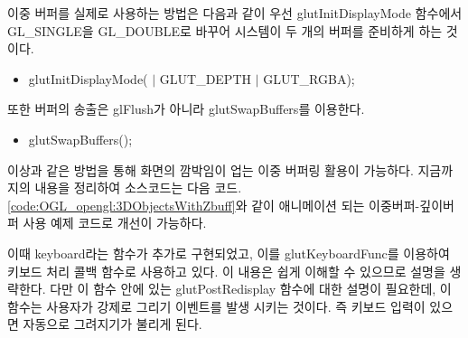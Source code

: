 이중 버퍼를 실제로 사용하는 방법은 다음과 같이 우선 glutInitDisplayMode 함수에서 {\sf GL\_SINGLE}을 {\sf GL\_DOUBLE}로 바꾸어 시스템이 두 개의 버퍼를 준비하게 하는 것이다.

\begin{itemize}
\item {\sf glutInitDisplayMode( \color{red}{GLUT\_DOUBLE} $|$ GLUT\_DEPTH $|$ GLUT\_RGBA);}
\end{itemize}

또한 버퍼의 송출은 {\sf glFlush}가 아니라 {\sf glutSwapBuffers}를 이용한다.

\begin{itemize}
\item {\sf glutSwapBuffers();}
\end{itemize}

이상과 같은 방법을 통해 화면의 깜박임이 업는 이중 버퍼링 활용이 가능하다. 지금까지의 내용을 정리하여 소스코드는 다음 코드. \ref{code:OGL_opengl:3DObjectsWithZbuff}와 같이 애니메이션 되는 이중버퍼-깊이버퍼 사용 예제 코드로 개선이 가능하다.

이때 {\sf keyboard}라는 함수가 추가로 구현되었고, 이를 {\sf glutKeyboardFunc}를 이용하여 키보드 처리 콜백 함수로 사용하고 있다. 이 내용은 쉽게 이해할 수 있으므로 설명을 생략한다. 다만 이 함수 안에 있는 {\sf glutPostRedisplay} 함수에 대한 설명이 필요한데, 이 함수는 사용자가 강제로 그리기 이벤트를 발생 시키는 것이다. 즉 키보드 입력이 있으면 자동으로 그려지기가 불리게 된다.

